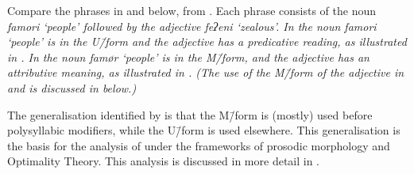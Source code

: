 Compare the phrases in  and  below, from \citet[14]{ch40}.
Each phrase consists of the noun \it{famori} `people'
followed by the adjective \it{feʔeni} `zealous'.
In  the noun \it{famori} `people' is in the U\=/form
and the adjective has a predicative reading,
as illustrated in .
In  the noun \it{famør} `people' is in the M\=/form,
and the adjective has an attributive meaning,
as illustrated in .
(The use of the M\=/form of the adjective in 
and  is discussed in  below.)

\begin{multicols}{2}
	\begin{exe}\let\eachwordone=\itshape
		\label{ex:ThePeoAre}
		\label{ex:TheZeaPeo}
	\end{exe}
\end{multicols}
\begin{multicols}{2}
	\begin{exe}
		\label{tr:ThePeoAre}
		\label{tr:TheZeaPeo}
	\end{exe}
\end{multicols}

The generalisation identified by \citet{haki98}
is that the M\=/form is (mostly) used before polysyllabic modifiers,
while the U\=/form is used elsewhere.
This generalisation is the basis for the analysis
of \cite{mcc00} under the frameworks of prosodic
morphology and Optimality Theory.
This analysis is discussed in more detail in .


